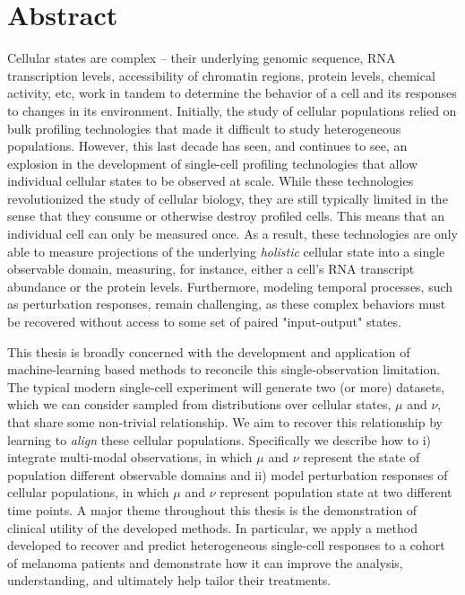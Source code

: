 
\begingroup
\let\clearpage\relax
\let\cleardoublepage\relax
\let\cleardoublepage\relax

\chapter*{Abstract}
Cellular states are complex -- their underlying genomic sequence, RNA transcription levels, accessibility of chromatin regions, protein levels, chemical activity, etc, work in tandem to determine the behavior of a cell and its responses to changes in its environment. 
Initially, the study of cellular populations relied on bulk profiling technologies
that made it difficult to study heterogeneous populations.
However, this last decade has seen, and continues to see, an explosion in the development of single-cell profiling technologies that allow individual cellular states to be observed at scale.
While these technologies revolutionized the study of cellular biology, they are still typically limited in the sense that they consume or otherwise destroy profiled cells.
This means that an individual cell can only be measured once.
As a result, these technologies are only able to measure projections of the underlying \textit{holistic} cellular state into a single observable domain, measuring, for instance, either a cell's RNA transcript abundance or the protein levels.
Furthermore, modeling temporal processes, such as perturbation responses, remain challenging, as these complex behaviors must be recovered without access to some set of paired "input-output" states.

This thesis is broadly concerned with the development and application of machine-learning based methods to reconcile this single-observation limitation.
The typical modern single-cell experiment will generate two (or more) datasets, which we can consider sampled from distributions over cellular states, $\mu$ and $\nu$, that share some non-trivial relationship.
We aim to recover this relationship by learning to \emph{align} these cellular populations.
Specifically we describe how to
i) integrate multi-modal observations, in which $\mu$ and $\nu$ represent the state of population different observable domains
and ii) model perturbation responses of cellular populations, in which $\mu$ and $\nu$ represent population state at two different time points.
A major theme throughout this thesis is the demonstration of clinical utility of the developed methods.
In particular, we apply a method developed to recover and predict heterogeneous single-cell responses to a cohort of melanoma patients and demonstrate how it can improve the analysis, understanding, and ultimately help tailor their treatments.




